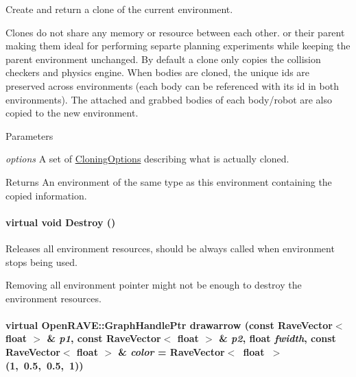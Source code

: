 Create and return a clone of the current environment. 

Clones do not share any memory or resource between each other. or their parent making them ideal for performing separte planning experiments while keeping the parent environment unchanged. By default a clone only copies the collision checkers and physics engine. When bodies are cloned, the unique ids are preserved across environments (each body can be referenced with its id in both environments). The attached and grabbed bodies of each body/robot are also copied to the new environment. 
\begin{DoxyParams}{Parameters}
\item[{\em options}]A set of \hyperlink{namespaceOpenRAVE_a16bea31a72c441a002538eac01a118f2}{CloningOptions} describing what is actually cloned. \end{DoxyParams}
\begin{DoxyReturn}{Returns}
An environment of the same type as this environment containing the copied information. 
\end{DoxyReturn}
\hypertarget{classOpenRAVE_1_1EnvironmentBase_a84693792fa8cba90b312c0b1caf53716}{
\paragraph[{Destroy}]{\setlength{\rightskip}{0pt plus 5cm}virtual void Destroy ()}\hfill}
\label{classOpenRAVE_1_1EnvironmentBase_a84693792fa8cba90b312c0b1caf53716}


Releases all environment resources, should be always called when environment stops being used. 

Removing all environment pointer might not be enough to destroy the environment resources. \hypertarget{classOpenRAVE_1_1EnvironmentBase_a3f00f299110fe455e0c4df096695b985}{
\paragraph[{drawarrow}]{\setlength{\rightskip}{0pt plus 5cm}virtual OpenRAVE::GraphHandlePtr drawarrow (const RaveVector$<$ float $>$ \& {\em p1}, \/  const RaveVector$<$ float $>$ \& {\em p2}, \/  float {\em fwidth}, \/  const RaveVector$<$ float $>$ \& {\em color} = {\ttfamily RaveVector$<$~float~$>$(1,~0.5,~0.5,~1)})}\hfill}
\label{classOpenRAVE_1_1EnvironmentBase_a3f00f299110fe455e0c4df096695b985}


